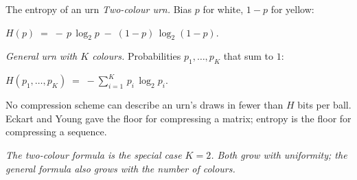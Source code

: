 


\begin{frame}{The entropy of an urn}
  \footnotesize
  \emph{Two-colour urn.}  Bias $p$ for white, $1 - p$ for yellow:
  \medskip
  \begin{center}
    $\displaystyle H(p) \;=\; -\,p\,\log_2 p \;-\; (1 - p)\,\log_2 (1 - p).$
  \end{center}

  \medskip
  \emph{General urn with $K$ colours.}  Probabilities
  $p_1, \ldots, p_K$ that sum to $1$:
  \medskip
  \begin{center}
    $\displaystyle H(p_1, \ldots, p_K) \;=\; -\sum_{i = 1}^{K}\, p_i\,\log_2 p_i.$
  \end{center}

  \medskip
  No compression scheme can describe an urn's draws in fewer than $H$
  bits per ball.  Eckart and Young gave the floor for compressing a
  matrix; entropy is the floor for compressing a sequence.

  \medskip
  \begin{center}
    \scriptsize\itshape\color{mutedWarmGray}
    The two-colour formula is the special case $K = 2$.  Both grow with
    uniformity; the general formula also grows with the number of colours.
  \end{center}
\end{frame}

